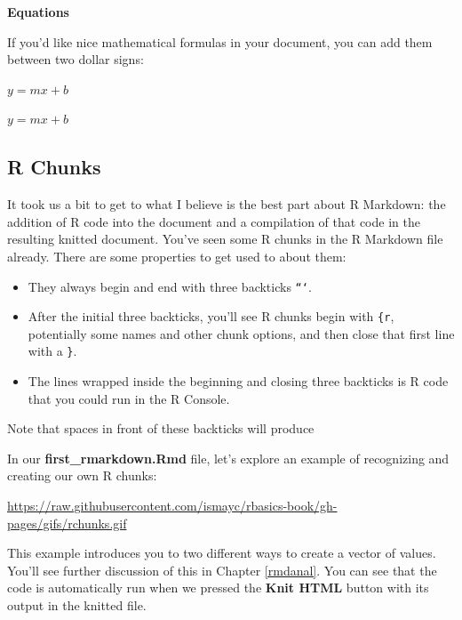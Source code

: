 \documentclass[]{tufte-book}
\newenvironment{Shaded}{\begin{snugshade}}{\end{snugshade}}
\newcommand{\NormalTok}[1]{{#1}}
\providecommand{\tightlist}{%
  \setlength{\itemsep}{0pt}\setlength{\parskip}{0pt}}
\theoremstyle{definition}
\theoremstyle{definition}
\theoremstyle{remark}
\begin{document}
\noindent\textbf{Equations}\vspace*{0.1in}

If you'd like nice mathematical formulas in your document, you can add
them between two dollar signs:

\begin{Shaded}
\begin{Highlighting}[]
\NormalTok{$y = mx + b$}
\end{Highlighting}
\end{Shaded}

\(y = mx + b\)

\subsection{R Chunks}\label{r-chunks}

It took us a bit to get to what I believe is the best part about R
Markdown: the addition of R code into the document and a compilation of
that code in the resulting knitted document. You've seen some R chunks
in the R Markdown file already. There are some properties to get used to
about them:

\begin{itemize}
\tightlist
\item
  They always begin and end with three backticks \texttt{```}.
\item
  After the initial three backticks, you'll see R chunks begin with
  \texttt{\{r}, potentially some names and other chunk options, and then
  close that first line with a \texttt{\}}.
\item
  The lines wrapped inside the beginning and closing three backticks is
  R code that you could run in the R Console.
\end{itemize}

Note that spaces in front of these backticks will produce

In our \textbf{first\_rmarkdown.Rmd} file, let's explore an example of
recognizing and creating our own R chunks:

\vspace{0.1in}

\begin{center}\footnotesize{\url{https://raw.githubusercontent.com/ismayc/rbasics-book/gh-pages/gifs/rchunks.gif}}\end{center}

\vspace{0.1in}

This example introduces you to two different ways to create a vector of
values. You'll see further discussion of this in Chapter \ref{rmdanal}.
You can see that the code is automatically run when we pressed the
\textbf{Knit HTML} button with its output in the knitted file.
\end{document}
